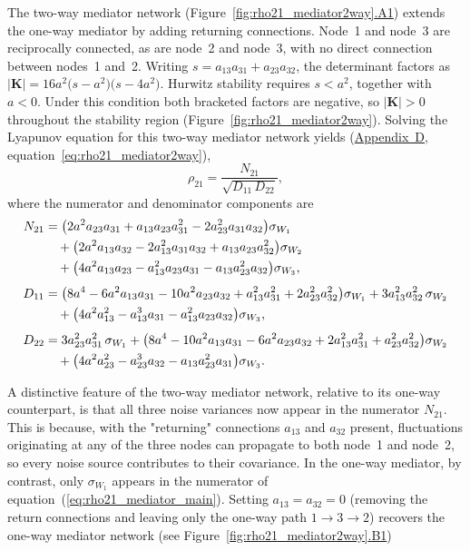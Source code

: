 \documentclass[12pt]{article}
\begin{document}
The two-way mediator network
(Figure~\ref{fig:rho21_mediator2way}\hyperref[fig:mediator2way_A1]{.A1})
extends the one-way mediator by adding returning connections. Node~1 and node~3 are reciprocally connected, as are node~2
and node~3, with no direct connection between nodes~1 and~2.
Writing $s=a_{13}a_{31}+a_{23}a_{32}$, the determinant factors
as $|\mathbf{K}|=16a^2\bigl(s-a^2\bigr)\bigl(s-4a^2\bigr)$.
Hurwitz stability requires $s<a^2$, together with $a<0$.
Under this condition both bracketed factors are negative, so
$|\mathbf{K}|>0$ throughout the stability region
(Figure~\ref{fig:rho21_mediator2way}).
Solving the Lyapunov equation for this two-way mediator
network yields (\hyperref[app:appD]{Appendix~D},
equation~\ref{eq:rho21_mediator2way}),
\begin{equation}
\rho_{21} = \frac{N_{21}}{\sqrt{D_{11}\,D_{22}}},
\label{eq:rho21_med2way_main}
\end{equation}
where the numerator and denominator components are
\begin{align}
N_{21} &= \bigl(2a^2a_{23}a_{31} + a_{13}a_{23}a_{31}^2
          - 2a_{23}^2a_{31}a_{32}\bigr)\sigma_{W_1} \notag\\
&\quad+ \bigl(2a^2a_{13}a_{32} - 2a_{13}^2a_{31}a_{32}
          + a_{13}a_{23}a_{32}^2\bigr)\sigma_{W_2} \notag\\
&\quad+ \bigl(4a^2a_{13}a_{23} - a_{13}^2a_{23}a_{31}
          - a_{13}a_{23}^2a_{32}\bigr)\sigma_{W_3},
\label{eq:N21_med2way_main}\\[4pt]
D_{11} &= \bigl(8a^4 - 6a^2a_{13}a_{31} - 10a^2a_{23}a_{32}
          + a_{13}^2a_{31}^2 + 2a_{23}^2a_{32}^2\bigr)\sigma_{W_1}
          + 3a_{13}^2a_{32}^2\,\sigma_{W_2} \notag\\
&\quad+ \bigl(4a^2a_{13}^2 - a_{13}^3a_{31}
          - a_{13}^2a_{23}a_{32}\bigr)\sigma_{W_3},
\label{eq:D11_med2way_main}\\[4pt]
D_{22} &= 3a_{23}^2a_{31}^2\,\sigma_{W_1}
          + \bigl(8a^4 - 10a^2a_{13}a_{31} - 6a^2a_{23}a_{32}
          + 2a_{13}^2a_{31}^2 + a_{23}^2a_{32}^2\bigr)\sigma_{W_2} \notag\\
&\quad+ \bigl(4a^2a_{23}^2 - a_{23}^3a_{32}
          - a_{13}a_{23}^2a_{31}\bigr)\sigma_{W_3}.
\label{eq:D22_med2way_main}
\end{align}

A distinctive feature of the two-way mediator network, relative to its
one-way counterpart, is that all three noise variances now
appear in the numerator $N_{21}$.
This is because, with the "returning" connections $a_{13}$ and
$a_{32}$ present, fluctuations originating at any of the three
nodes can propagate to both node~1 and node~2, so every noise
source contributes to their covariance.
In the one-way mediator, by contrast, only $\sigma_{W_1}$
appears in the numerator of equation~(\ref{eq:rho21_mediator_main}).
Setting $a_{13}=a_{32}=0$ (removing the return connections and
leaving only the one-way path $1\to3\to2$) recovers the one-way
mediator network (see Figure~\ref{fig:rho21_mediator2way}\hyperref[fig:mediator2way_B1]{.B1})
\end{document}

